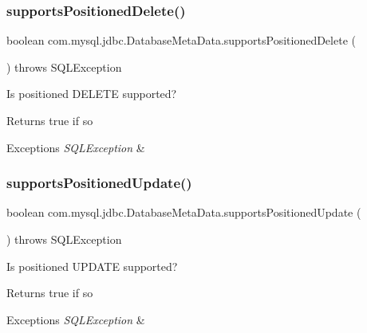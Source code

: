 \subsubsection{\texorpdfstring{supports\+Positioned\+Delete()}{supportsPositionedDelete()}}
{\footnotesize\ttfamily boolean com.\+mysql.\+jdbc.\+Database\+Meta\+Data.\+supports\+Positioned\+Delete (\begin{DoxyParamCaption}{ }\end{DoxyParamCaption}) throws S\+Q\+L\+Exception}

Is positioned D\+E\+L\+E\+TE supported?

\begin{DoxyReturn}{Returns}
true if so 
\end{DoxyReturn}

\begin{DoxyExceptions}{Exceptions}
{\em S\+Q\+L\+Exception} & \\
\hline
\end{DoxyExceptions}
\mbox{\label{classcom_1_1mysql_1_1jdbc_1_1_database_meta_data_a50233d46e523a8369a02ff3a52137c32}} 
\subsubsection{\texorpdfstring{supports\+Positioned\+Update()}{supportsPositionedUpdate()}}
{\footnotesize\ttfamily boolean com.\+mysql.\+jdbc.\+Database\+Meta\+Data.\+supports\+Positioned\+Update (\begin{DoxyParamCaption}{ }\end{DoxyParamCaption}) throws S\+Q\+L\+Exception}

Is positioned U\+P\+D\+A\+TE supported?

\begin{DoxyReturn}{Returns}
true if so 
\end{DoxyReturn}

\begin{DoxyExceptions}{Exceptions}
{\em S\+Q\+L\+Exception} & \\
\hline
\end{DoxyExceptions}
\mbox{\label{classcom_1_1mysql_1_1jdbc_1_1_database_meta_data_a78549c381a36ac93cfac55d0cc4760bf}} 
